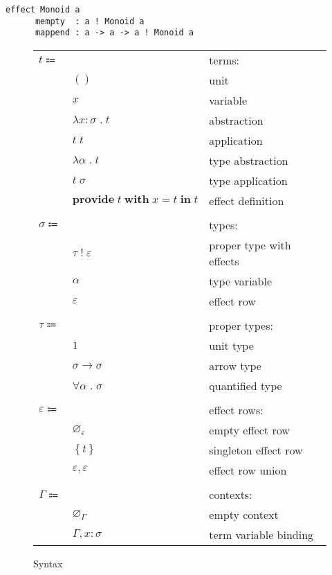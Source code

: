 \documentclass[12pt]{article}
\newcommand\anno[2]{#1 : #2}
\newcommand\term{t}
\newcommand\eunit{()}
\newcommand\evar{x}
\newcommand\eabs[2]{\lambda #1 \; . \; #2}
\newcommand\eapp[2]{#1 \; #2}
\newcommand\etabs[2]{\lambda #1 \; . \; #2}
\newcommand\etapp[2]{#1 \; #2}
\newcommand\eprovide[4]{\textbf{provide} \; #1 \; \textbf{with} \; #2 = #3 \; \textbf{in} \; #4}
\newcommand\type{\sigma}
\newcommand\tptwithr[2]{#1 \; ! \; #2}
\newcommand\tvar{\alpha}
\newcommand\properType{\tau}
\newcommand\ptunit{1}
\newcommand\ptarrow[2]{#1 \rightarrow #2}
\newcommand\ptforall[2]{\forall #1 \; . \; #2}
\newcommand\row{\varepsilon}
\newcommand\rempty{\varnothing_{\row}}
\newcommand\rsingleton[1]{\left\{ #1 \right\}}
\newcommand\runion[2]{#1, #2}
\newcommand\context{\Gamma}
\newcommand\cempty{\varnothing_{\context}}
\newcommand\ceextend[2]{#1, #2}
\begin{document}
  \begin{lstlisting}[gobble=4]
    effect Monoid a
      mempty  : a ! Monoid a
      mappend : a -> a -> a ! Monoid a
  \end{lstlisting}

  \begin{figure}
    \begin{mdframed}[backgroundcolor=none]
      \begin{center}
        \begin{tabular}{l l l}
          $\term \Coloneqq $ & & terms: \\
          & $\eunit$ & unit \\
          & $\evar$ & variable \\
          & $\eabs{\anno{\evar}{\type}}{\term}$ & abstraction \\
          & $\eapp{\term}{\term}$ & application \\
          & $\etabs{\tvar}{\term}$ & type abstraction \\
          & $\etapp{\term}{\type}$ & type application \\
          & $\eprovide{\term}{\evar}{\term}{\term}$ & effect definition \\
          \\
          $\type \Coloneqq$ & & types: \\
          & $\tptwithr{\properType}{\row}$ & proper type with effects \\
          & $\tvar$ & type variable \\
          & $\row$ & effect row \\
          \\
          $\properType \Coloneqq$ & & proper types: \\
          & $\ptunit$ & unit type \\
          & $\ptarrow{\type}{\type}$ & arrow type \\
          & $\ptforall{\tvar}{\type}$ & quantified type \\
          \\
          $\row \Coloneqq$ & & effect rows: \\
          & $\rempty$ & empty effect row \\
          & $\rsingleton{\term}$ & singleton effect row \\
          & $\runion{\row}{\row}$ & effect row union \\
          \\
          $\context \Coloneqq$ & & contexts: \\
          & $\cempty$ & empty context \\
          & $\ceextend{\context}{\anno{\evar}{\type}}$ & term variable binding \\
        \end{tabular}
      \end{center}

      \caption{Syntax}\label{fig:syntax}
    \end{mdframed}
  \end{figure}
\end{document}
